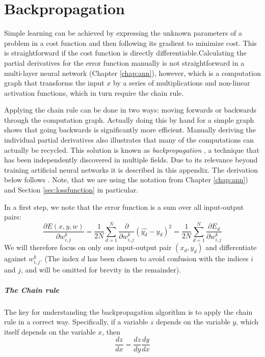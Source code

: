 \chapter{Backpropagation}\label{ch:backpropagation}
\label{sec:backpropagation}

Simple learning can be achieved by expressing the unknown parameters of a problem in a cost function and then following its gradient to minimize cost. This is straightforward if the cost function is directly differentiable.Calculating the partial derivatives for the error function manually is not straightforward in a multi-layer neural network (Chapter \ref{chap:ann}), however, which is a computation graph that transforms the input $x$ by a series of multiplications and non-linear activation functions, which in turn require the chain rule.

Applying the chain rule can be done in two ways: moving forwards or backwards through the computation graph. Actually doing this by hand for a simple graph shows that going backwards is significantly more efficient. Manually deriving the individual partial derivatives also illustrates that many of the computations can actually be recycled. This solution is known as \textsl{backpropagation} \cite{werbos1990backpropagation}, a technique that has been independently discovered in multiple fields. Due to its relevance beyond training artificial neural networks it is described in this appendix. The derivation below follows \cite{backpropagation}. Note, that we are using the notation from Chapter \ref{chap:ann}) and Section \ref{sec:lossfunction} in particular. 

In a first step, we note that the error function is a sum over all input-output pairs:
\begin{equation}
\frac{\partial E(x,y,w)}{\partial w_{i,j}^k}=\frac{1}{2N}\sum^N_{d=1}\frac{\partial}{\partial w_{i,j}^k}(\hat{y_d}-y_d)^2=\frac{1}{2N}\sum_{d=1}^N\frac{\partial E_d}{\partial w_{i,j}^k}
\end{equation}
We will therefore focus on only one input-output pair $(x_d,y_d)$ and differentiate against $w_{i,j}^k$. (The index $d$ has been chosen to avoid confusion with the indices $i$ and $j$, and will be omitted for brevity in the remainder).

\paragraph{The Chain rule} The key for understanding the backpropagation algorithm is to apply the chain rule in a correct way. Specifically, if a variable $z$ depends on the variable $y$, which itself depends on the variable $x$, then
\begin{equation}
\frac{dz}{dx}=\frac{dz}{dy}\frac{dy}{dx}
\end{equation}

